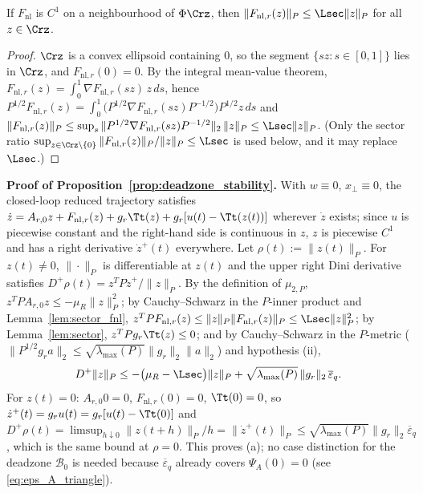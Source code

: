 \begin{lemma}
\label{lem:sector_fnl}
If \(F_{\mathrm{nl}}\) is \(C^1\) on a neighbourhood of \(\Phi\Crz\), then \(\|F_{\mathrm{nl},r}(z)\|_P \le \Lsec\|z\|_P\) for all \(z \in \Crz\).
\end{lemma}
\begin{proof}
\(\Crz\) is a convex ellipsoid containing \(0\), so the segment \(\{sz : s \in [0,1]\}\) lies in \(\Crz\), and \(F_{\mathrm{nl},r}(0) = 0\). By the integral mean-value theorem, \(F_{\mathrm{nl},r}(z) = \int_0^1\nabla F_{\mathrm{nl},r}(sz)\,z\,ds\), hence \(P^{1/2}F_{\mathrm{nl},r}(z) = \int_0^1 \big(P^{1/2}\nabla F_{\mathrm{nl},r}(sz)P^{-1/2}\big)P^{1/2}z\,ds\) and \(\|F_{\mathrm{nl},r}(z)\|_P \le \sup_{s}\|P^{1/2}\nabla F_{\mathrm{nl},r}(sz)P^{-1/2}\|_2\,\|z\|_P \le \Lsec\|z\|_P\). (Only the sector ratio \(\sup_{z \in \Crz\setminus\{0\}}\|F_{\mathrm{nl},r}(z)\|_P/\|z\|_P \le \Lsec\) is used below, and it may replace \(\Lsec\).)
\end{proof}

\textbf{Proof of Proposition~\ref{prop:deadzone_stability}.} With \(w \equiv 0\), \(x_\perp \equiv 0\), the closed-loop reduced trajectory satisfies \(\dot{z} = A_{r,0} z + F_{\mathrm{nl},r}(z) + g_r \Tt(z) + g_r[u(t) - \Tt(z(t))]\) wherever \(\dot z\) exists; since \(u\) is piecewise constant and the right-hand side is continuous in \(z\), \(z\) is piecewise \(C^1\) and has a right derivative \(\dot z^+(t)\) everywhere. Let \(\rho(t) := \|z(t)\|_P\).
For \(z(t) \neq 0\), \(\|\cdot\|_P\) is differentiable at \(z(t)\) and the upper right Dini derivative satisfies \(D^+\rho(t) = z^TP\dot z^+/\|z\|_P\). By the definition of \(\mu_{2,P}\), \(z^TPA_{r,0}z \le -\mu_R\|z\|_P^2\); by Cauchy--Schwarz in the \(P\)-inner product and Lemma~\ref{lem:sector_fnl}, \(z^TPF_{\mathrm{nl},r}(z) \le \|z\|_P\|F_{\mathrm{nl},r}(z)\|_P \le \Lsec\|z\|_P^2\); by Lemma~\ref{lem:sector}, \(z^T P g_r \Tt(z) \le 0\); and by Cauchy--Schwarz in the \(P\)-metric (\(\|P^{1/2} g_r a\|_2 \le \sqrt{\lambda_{\max}(P)}\|g_r\|_2\|a\|_2\)) and hypothesis (ii),
\[
D^+ \|z\|_P \le -\big(\mu_R - \Lsec\big)\|z\|_P + \sqrt{\lambda_{\max}(P)}\,\|g_r\|_2\,\overline{\varepsilon}_q .
\]
For \(z(t) = 0\): \(A_{r,0}0 = 0\), \(F_{\mathrm{nl},r}(0) = 0\), \(\Tt(0) = 0\), so \(\dot z^+(t) = g_ru(t) = g_r[u(t) - \Tt(0)]\) and \(D^+\rho(t) = \limsup_{h\downarrow0}\|z(t+h)\|_P/h = \|\dot z^+(t)\|_P \le \sqrt{\lambda_{\max}(P)}\|g_r\|_2\overline{\varepsilon}_q\), which is the same bound at \(\rho = 0\). This proves (a); no case distinction for the deadzone \(\mathcal{B}_0\) is needed because \(\overline{\varepsilon}_q\) already covers \(\Psi_A(0) = 0\) (see \eqref{eq:eps_A_triangle}).

